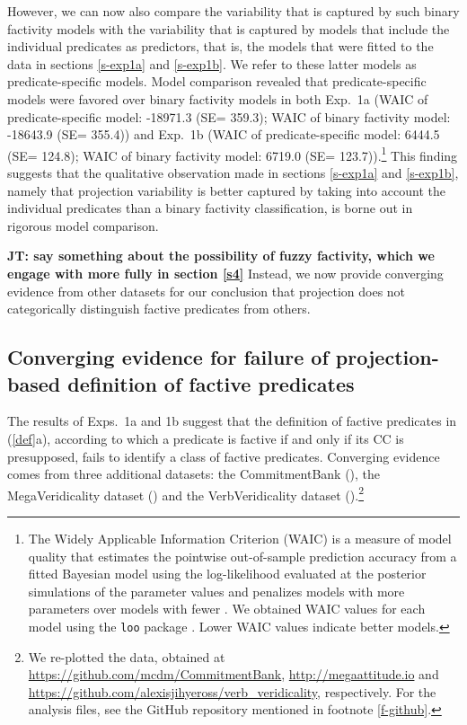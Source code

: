\documentclass[11pt,fleqn]{article}
\newcommand{\6}{\mbox{$[\hspace*{-.6mm}[$}}
\newcommand{\9}{\mbox{$]\hspace*{-.6mm}]$}}
\newcommand{\jt}[1]{\textbf{\color{blue}JT: #1}}
\begin{document}
However, we can now also compare the variability that is captured by such binary factivity models with the variability that is captured by models that include the individual predicates as predictors, that is, the models that were fitted to the data in sections \ref{s-exp1a} and \ref{s-exp1b}. We refer to these latter models as predicate-specific models. Model comparison revealed that predicate-specific models were favored over binary factivity models in both Exp.~1a (WAIC of predicate-specific model: -18971.3 (SE= 359.3); WAIC of binary factivity model: -18643.9 (SE= 355.4))  and Exp.~1b (WAIC of predicate-specific model: 6444.5 (SE= 124.8); WAIC of binary factivity model: 6719.0 (SE= 123.7)).\footnote{The Widely Applicable Information Criterion (WAIC) is a measure of model quality that estimates the pointwise out-of-sample prediction accuracy from a fitted Bayesian model using the log-likelihood evaluated at the posterior simulations of the parameter values and penalizes models with more parameters over models with fewer \citep{watanabe2010}. We obtained WAIC values for each model using the \texttt{loo} package \citep{vehtari2017}. Lower WAIC values indicate better models.} This finding suggests that the qualitative observation made in sections  \ref{s-exp1a} and \ref{s-exp1b}, namely that projection variability is better captured by taking into account the individual predicates than a binary factivity classification, is borne out in rigorous model comparison.

\jt{say something about the possibility of fuzzy factivity, which we engage with more fully in section \ref{s4}} Instead, we now provide converging evidence from other datasets for our conclusion that projection does not categorically distinguish factive predicates from others.


\subsection{Converging evidence for failure of projection-based definition of factive predicates}\label{s-converging1}

The results of  Exps.~1a and 1b suggest that the definition of factive predicates in (\ref{def}a), according to which a predicate is factive if and only if its CC is presupposed, fails to identify a class of factive predicates. Converging evidence comes from three additional datasets: the CommitmentBank (\citealt*{demarneffe-etal-sub23}), the MegaVeridicality dataset (\citealt{white-rawlins-nels2018,white-etal2018b}) and the VerbVeridicality dataset (\citealt{ross-pavlick2019}).\footnote{We re-plotted the data, obtained at \url{https://github.com/mcdm/CommitmentBank}, \url{http://megaattitude.io} and \url{https://github.com/alexisjihyeross/verb_veridicality}, respectively. For the analysis files, see the GitHub repository mentioned in footnote \ref{f-github}.}
\end{document}
